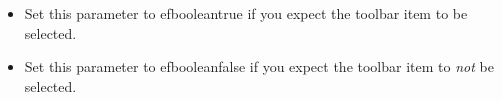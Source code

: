 
\begin{itemize}
\item Set this parameter to \app{}efbooleantrue{} if you expect the toolbar item to be  selected.
\item Set this parameter to \app{}efbooleanfalse{} if you expect the toolbar item to \emph{not} be selected.
\end{itemize}


